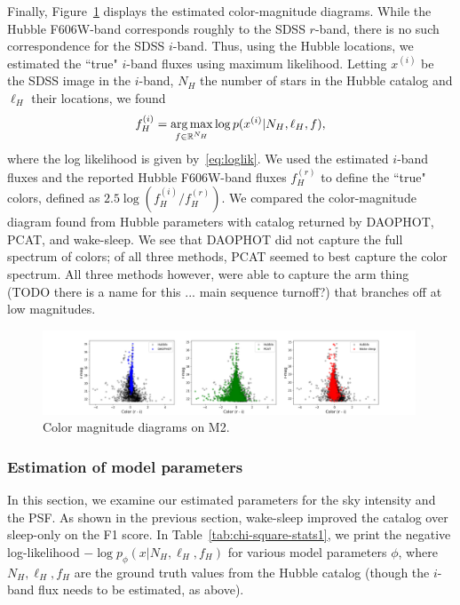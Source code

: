 Finally, Figure~\ref{fig:cmd_m2} displays the estimated color-magnitude diagrams. While the Hubble F606W-band corresponds roughly to the SDSS $r$-band, there is no such correspondence for the SDSS $i$-band. Thus, using the Hubble locations, we estimated the ``true" $i$-band fluxes using maximum likelihood. Letting $x^{(i)}$ be the SDSS image in the $i$-band, $N_H$ the number of stars in the Hubble catalog and $\ell_H$ their locations, we found  
\begin{align}
   f^{(i)}_H = \operatorname*{arg\,max}_{f\in\mathbb{R}^{N_H}} \log p(x^{(i)} | N_H, \ell_H, f)
   \label{eq:optim_iband_flux},
\end{align}
where the log likelihood is given by~\eqref{eq:loglik}. We used the estimated $i$-band fluxes and the reported Hubble F606W-band fluxes $f_H^{(r)}$ to define the ``true" colors, defined as $2.5\log(f_H^{(i)}/f_H^{(r)})$. We compared
the color-magnitude diagram found from Hubble parameters with catalog returned by DAOPHOT, PCAT, and wake-sleep. We see that DAOPHOT did not capture the full spectrum of colors; of all three methods, PCAT seemed to best capture the color spectrum. All three methods however, were able to capture the arm thing (TODO there is a name for this ... main sequence turnoff?) that branches off at low magnitudes. 

\begin{figure}[ht]
    \centering
    \includegraphics[width=0.99\textwidth]{figures/cmd.png}
    \caption{Color magnitude diagrams on M2. }
    \label{fig:cmd_m2}
\end{figure}


\subsubsection{Estimation of model parameters}
\label{sec:results_model_params}
In this section, we examine our estimated parameters 
for the sky intensity and the PSF. As shown in the previous section, wake-sleep improved the catalog over sleep-only on the F1 score. In Table~\ref{tab:chi-square-stats1}, we
print the negative log-likelihood $- \log p_\phi(x | N_{H}, \ell_{H}, f_{H})$ for various model parameters $\phi$, where $N_{H}, \ell_{H}, f_{H}$ are the ground truth
values from the Hubble catalog (though the $i$-band flux needs to be estimated, as above). 

